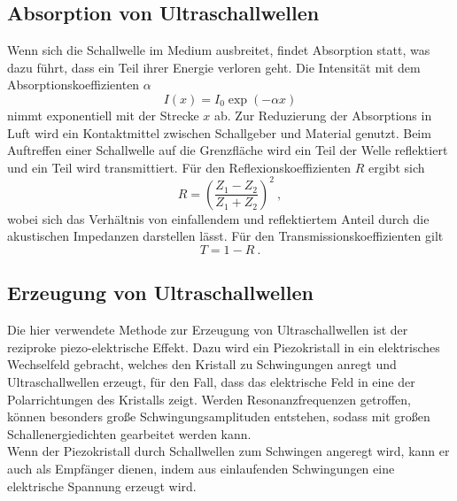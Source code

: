 \subsection{Absorption von Ultraschallwellen}

    Wenn sich die Schallwelle im Medium ausbreitet,
    findet Absorption statt,
    was dazu führt,
    dass ein Teil ihrer Energie verloren geht.
    Die Intensität mit dem Absorptionskoeffizienten $\alpha$
    \begin{equation}
        \label{eqn:absorptionskurve}
        I(x) = I_0 \exp{(-\alpha x)}
    \end{equation}
    nimmt exponentiell mit der Strecke $x$ ab.
    Zur Reduzierung der Absorptions in Luft wird ein Kontaktmittel zwischen Schallgeber und Material genutzt.
    Beim Auftreffen einer Schallwelle auf die Grenzfläche wird ein Teil der Welle reflektiert und ein Teil wird transmittiert.
    Für den Reflexionskoeffizienten $R$ ergibt sich
    \begin{equation}
        R = \left(\frac{Z_1 - Z_2}{Z_1 + Z_2}\right)^2 \ ,
        \label{eqn:reflexion}
    \end{equation}
    wobei sich das Verhältnis von einfallendem und reflektiertem Anteil durch die akustischen Impedanzen darstellen lässt.
    Für den Transmissionskoeffizienten gilt
    \begin{equation}
        T = 1 - R \ .
        \label{eqn:transmission}
    \end{equation}


\subsection{Erzeugung von Ultraschallwellen}

    Die hier verwendete Methode zur Erzeugung von Ultraschallwellen ist der reziproke piezo-elektrische Effekt.
    Dazu wird ein Piezokristall in ein elektrisches Wechselfeld gebracht,
    welches den Kristall zu Schwingungen anregt und Ultraschallwellen erzeugt,
    für den Fall,
    dass das elektrische Feld in eine der Polarrichtungen des Kristalls zeigt.
    Werden Resonanzfrequenzen getroffen,
    können besonders große Schwingungsamplituden entstehen,
    sodass mit großen Schallenergiedichten gearbeitet werden kann.\\
    Wenn der Piezokristall durch Schallwellen zum Schwingen angeregt wird,
    kann er auch als Empfänger dienen,
    indem aus einlaufenden Schwingungen eine elektrische Spannung erzeugt wird.


